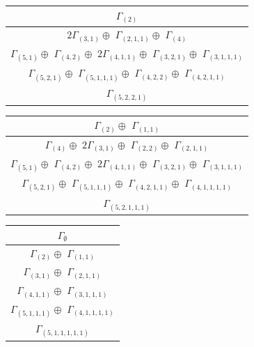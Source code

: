 \documentclass[main.tex]{subfiles}
\begin{document}
\begin{minipage}{.5\textwidth}
\centering
\begin{tabular}{c}
$\Gamma_{(
2
)}$
\\ \hline
$2\Gamma_{(
3 , 
1
)} \oplus$
$\Gamma_{(
2 , 
1 , 
1
)} \oplus$
$\Gamma_{(
4
)} $
\\ \hline
$\Gamma_{(
5 , 
1
)} \oplus$
$\Gamma_{(
4 , 
2
)} \oplus$
$2\Gamma_{(
4 , 
1 , 
1
)} \oplus$
$\Gamma_{(
3 , 
2 , 
1
)} \oplus$
$\Gamma_{(
3 , 
1 , 
1 , 
1
)}$
\\ \hline
$\Gamma_{(
5 , 
2 , 
1
)} \oplus$
$\Gamma_{(
5 , 
1 , 
1 , 
1
)} \oplus$
$\Gamma_{(
4 , 
2 , 
2
)} \oplus$
$\Gamma_{(
4 , 
2 , 
1 , 
1
)}$
\\ \hline
$\Gamma_{(
5 , 
2 , 
2 , 
1
)}$
\\
\end{tabular}\end{minipage}
\bigskip
\begin{minipage}{.5\textwidth}
\centering
\begin{tabular}{c}
$\Gamma_{(
2
)} \oplus$
$\Gamma_{(
1 , 
1
)}$
\\ \hline
$\Gamma_{(
4
)} \oplus$
$2\Gamma_{(
3 , 
1
)} \oplus$
$\Gamma_{(
2 , 
2
)} \oplus$
$\Gamma_{(
2 , 
1 , 
1
)}$
\\ \hline
$\Gamma_{(
5 , 
1
)} \oplus$
$\Gamma_{(
4 , 
2
)} \oplus$
$2\Gamma_{(
4 , 
1 , 
1
)} \oplus$
$\Gamma_{(
3 , 
2 , 
1
)} \oplus$
$\Gamma_{(
3 , 
1 , 
1 , 
1
)}$
\\ \hline
$\Gamma_{(
5 , 
2 , 
1
)} \oplus$
$\Gamma_{(
5 , 
1 , 
1 , 
1
)} \oplus$
$\Gamma_{(
4 , 
2 , 
1 , 
1
)} \oplus$
$\Gamma_{(
4 , 
1 , 
1 , 
1 , 
1
)}$
\\ \hline
$\Gamma_{(
5 , 
2 , 
1 , 
1 , 
1
)}$
\\
\end{tabular}\end{minipage}
\begin{minipage}{.25\textwidth}
\centering
\begin{tabular}{c}
$\Gamma_\emptyset$
\\ \hline
$\Gamma_{(
2
)} \oplus$
$\Gamma_{(
1 , 
1
)}$
\\ \hline
$\Gamma_{(
3 , 
1
)} \oplus$
$\Gamma_{(
2 , 
1 , 
1
)}$
\\ \hline
$\Gamma_{(
4 , 
1 , 
1
)} \oplus$
$\Gamma_{(
3 , 
1 , 
1 , 
1
)}$
\\ \hline
$\Gamma_{(
5 , 
1 , 
1 , 
1
)} \oplus$
$\Gamma_{(
4 , 
1 , 
1 , 
1 , 
1
)}$
\\ \hline
$\Gamma_{(
5 , 
1 , 
1 , 
1 , 
1 , 
1
)}$
\\
\end{tabular}\end{minipage}
\end{document}

